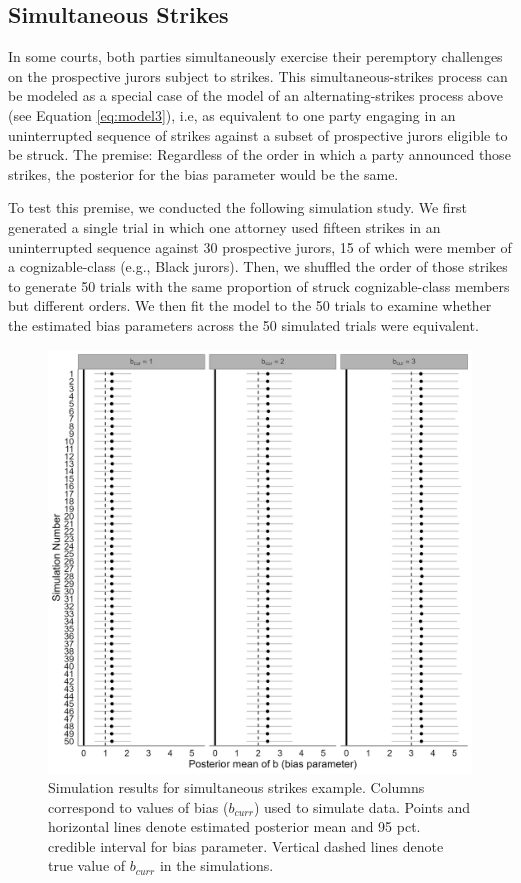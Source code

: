 \documentclass[12pt]{article}
\begin{document}
\hypertarget{simul-strikes}{%
\subsection{Simultaneous Strikes}\label{simul-strikes}}

In some courts, both parties simultaneously exercise their peremptory challenges on the prospective jurors subject to strikes. This simultaneous-strikes process can be modeled as a special case of the model of an alternating-strikes process above (see Equation \eqref{eq:model3}), i.e, as equivalent to one party engaging in an uninterrupted sequence of strikes against a subset of prospective jurors eligible to be struck. The premise: Regardless of the order in which a party announced those strikes, the posterior for the bias parameter would be the same.

To test this premise, we conducted the following simulation study. We first generated a single trial in which one attorney used fifteen strikes in an uninterrupted sequence against 30 prospective jurors, 15 of which were member of a cognizable-class (e.g., Black jurors). Then, we shuffled the order of those strikes to generate 50 trials with the same proportion of struck cognizable-class members but different orders. We then fit the model to the 50 trials to examine whether the estimated bias parameters across the 50 simulated trials were equivalent.

\begin{figure}

{\centering \includegraphics[width=0.75\linewidth]{../figures/simultaneous_sims_plot} 

}

\caption{Simulation results for simultaneous strikes example. Columns correspond to values of bias ($b_{curr}$) used to simulate data. Points and horizontal lines denote estimated posterior mean and 95 pct. credible interval for bias parameter. Vertical dashed lines denote true value of $b_{curr}$ in the simulations.}\label{fig:fig-simul}
\end{figure}
\end{document}
